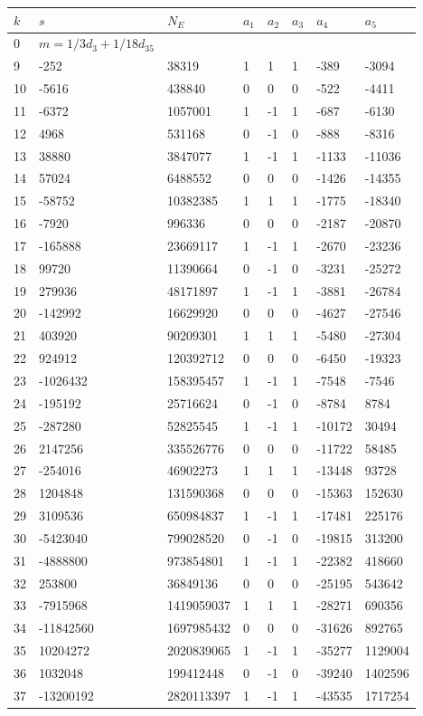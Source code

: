 \documentclass{amsart}
\begin{document}
\begin{longtable}{|l|l|l|lllll|}
\hline
$k$ & $s$ & $N_E$ & $a_1$ & $a_2$ & $a_3$ & $a_4$ & $a_5$\\
\hline
0&$m=1/3d_{3}+1/18d_{35}$&&\multicolumn{5}{c|}{}\\
9&-252&38319&1&1&1&-389&-3094\\
10&-5616&438840&0&0&0&-522&-4411\\
11&-6372&1057001&1&-1&1&-687&-6130\\
12&4968&531168&0&-1&0&-888&-8316\\
13&38880&3847077&1&-1&1&-1133&-11036\\
14&57024&6488552&0&0&0&-1426&-14355\\
15&-58752&10382385&1&1&1&-1775&-18340\\
16&-7920&996336&0&0&0&-2187&-20870\\
17&-165888&23669117&1&-1&1&-2670&-23236\\
18&99720&11390664&0&-1&0&-3231&-25272\\
19&279936&48171897&1&-1&1&-3881&-26784\\
20&-142992&16629920&0&0&0&-4627&-27546\\
21&403920&90209301&1&1&1&-5480&-27304\\
22&924912&120392712&0&0&0&-6450&-19323\\
23&-1026432&158395457&1&-1&1&-7548&-7546\\
24&-195192&25716624&0&-1&0&-8784&8784\\
25&-287280&52825545&1&-1&1&-10172&30494\\
26&2147256&335526776&0&0&0&-11722&58485\\
27&-254016&46902273&1&1&1&-13448&93728\\
28&1204848&131590368&0&0&0&-15363&152630\\
29&3109536&650984837&1&-1&1&-17481&225176\\
30&-5423040&799028520&0&-1&0&-19815&313200\\
31&-4888800&973854801&1&-1&1&-22382&418660\\
32&253800&36849136&0&0&0&-25195&543642\\
33&-7915968&1419059037&1&1&1&-28271&690356\\
34&-11842560&1697985432&0&0&0&-31626&892765\\
35&10204272&2020839065&1&-1&1&-35277&1129004\\
36&1032048&199412448&0&-1&0&-39240&1402596\\
37&-13200192&2820113397&1&-1&1&-43535&1717254\\

\end{longtable}
\end{document}
